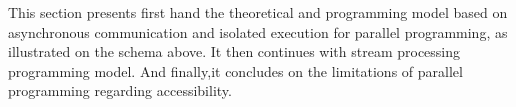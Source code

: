 This section presents first hand the theoretical and programming model based on asynchronous communication and isolated execution for parallel programming, as illustrated on the schema above.
It then continues with stream processing programming model. 
And finally,it concludes on the limitations of parallel programming regarding accessibility. 










